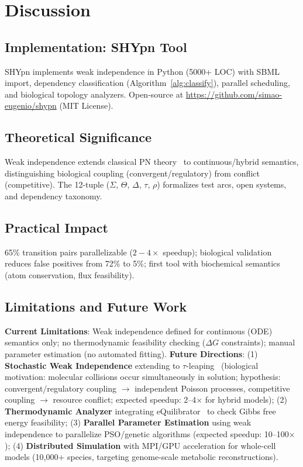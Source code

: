 \documentclass[twocolumn,11pt]{article}
\begin{document}
\section{Discussion}

\subsection{Implementation: SHYpn Tool}

SHYpn implements weak independence in Python (5000+ LOC) with SBML import, dependency classification (Algorithm~\ref{alg:classify}), parallel scheduling, and biological topology analyzers. Open-source at \url{https://github.com/simao-eugenio/shypn} (MIT License).

\subsection{Theoretical Significance}

Weak independence extends classical PN theory~\cite{Reisig2013,Murata1989} to continuous/hybrid semantics, distinguishing biological coupling (convergent/regulatory) from conflict (competitive). The 12-tuple ($\Sigma$, $\Theta$, $\Delta$, $\tau$, $\rho$) formalizes test arcs, open systems, and dependency taxonomy.

\subsection{Practical Impact}

65\% transition pairs parallelizable ($2{-}4\times$ speedup); biological validation reduces false positives from 72\% to 5\%; first tool with biochemical semantics (atom conservation, flux feasibility).

\subsection{Limitations and Future Work}

\textbf{Current Limitations}: Weak independence defined for continuous (ODE) semantics only; no thermodynamic feasibility checking (\(\Delta G\) constraints); manual parameter estimation (no automated fitting).
\textbf{Future Directions}: (1) \textbf{Stochastic Weak Independence} extending to \(\tau\)-leaping~\cite{Gillespie2001} (biological motivation: molecular collisions occur simultaneously in solution; hypothesis: convergent/regulatory coupling \(\to\) independent Poisson processes, competitive coupling \(\to\) resource conflict; expected speedup: 2--4\(\times\) for hybrid models); (2) \textbf{Thermodynamic Analyzer} integrating eQuilibrator~\cite{Flamholz2012} to check Gibbs free energy feasibility; (3) \textbf{Parallel Parameter Estimation} using weak independence to parallelize PSO/genetic algorithms (expected speedup: 10--100\(\times\)); (4) \textbf{Distributed Simulation} with MPI/GPU acceleration for whole-cell models (10,000+ species, targeting genome-scale metabolic reconstructions).
\end{document}
